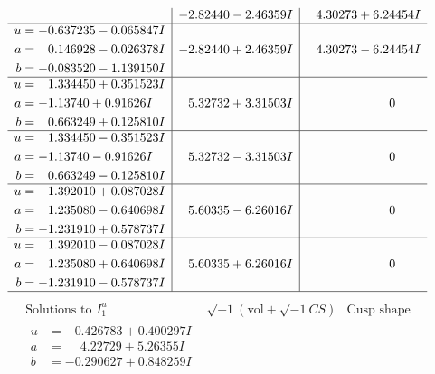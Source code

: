 \documentclass[1p]{elsarticle_modified}
\theoremstyle{definition}
\newcommand{\I}{\sqrt{-1}}
\begin{document}
$$\begin{array}{c|c|c}
 & -2.82440 - 2.46359 I & \phantom{-}4.30273 + 6.24454 I \\ \hline\begin{aligned}
u &= -0.637235 - 0.065847 I \\
a &= \phantom{-}0.146928 - 0.026378 I \\
b &= -0.083520 - 1.139150 I\end{aligned}
 & -2.82440 + 2.46359 I & \phantom{-}4.30273 - 6.24454 I \\ \hline\begin{aligned}
u &= \phantom{-}1.334450 + 0.351523 I \\
a &= -1.13740 + 0.91626 I \\
b &= \phantom{-}0.663249 + 0.125810 I\end{aligned}
 & \phantom{-}5.32732 + 3.31503 I & \phantom{-0.000000 } 0 \\ \hline\begin{aligned}
u &= \phantom{-}1.334450 - 0.351523 I \\
a &= -1.13740 - 0.91626 I \\
b &= \phantom{-}0.663249 - 0.125810 I\end{aligned}
 & \phantom{-}5.32732 - 3.31503 I & \phantom{-0.000000 } 0 \\ \hline\begin{aligned}
u &= \phantom{-}1.392010 + 0.087028 I \\
a &= \phantom{-}1.235080 - 0.640698 I \\
b &= -1.231910 + 0.578737 I\end{aligned}
 & \phantom{-}5.60335 - 6.26016 I & \phantom{-0.000000 } 0 \\ \hline\begin{aligned}
u &= \phantom{-}1.392010 - 0.087028 I \\
a &= \phantom{-}1.235080 + 0.640698 I \\
b &= -1.231910 - 0.578737 I\end{aligned}
 & \phantom{-}5.60335 + 6.26016 I & \phantom{-0.000000 } 0\\
 \hline 
 \end{array}$$\newpage$$\begin{array}{c|c|c}  
\text{Solutions to }I^u_{1}& \I (\text{vol} + \sqrt{-1}CS) & \text{Cusp shape}\\
 \hline 
\begin{aligned}
u &= -0.426783 + 0.400297 I \\
a &= \phantom{-}4.22729 + 5.26355 I \\
b &= -0.290627 + 0.848259 I\end{aligned}

\end{array}$$
\end{document}
